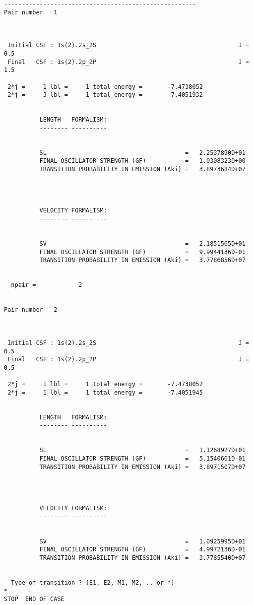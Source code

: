 \documentclass[fleqn,10pt]{book}
\begin{document}
\begin{verbatim}
------------------------------------------------------
Pair number   1



 Initial CSF : 1s(2).2s_2S                                        J = 0.5
 Final   CSF : 1s(2).2p_2P                                        J = 1.5

 2*j =     1 lbl =     1 total energy =       -7.4738052
 2*j =     3 lbl =     1 total energy =       -7.4051932


          LENGTH   FORMALISM: 
          -------- ----------


          SL                                       =   2.2537890D+01
          FINAL OSCILLATOR STRENGTH (GF)           =   1.0308323D+00
          TRANSITION PROBABILITY IN EMISSION (Aki) =   3.8973684D+07




          VELOCITY FORMALISM: 
          -------- ----------


          SV                                       =   2.1851565D+01
          FINAL OSCILLATOR STRENGTH (GF)           =   9.9944136D-01
          TRANSITION PROBABILITY IN EMISSION (Aki) =   3.7786856D+07


  npair =            2

------------------------------------------------------
Pair number   2



 Initial CSF : 1s(2).2s_2S                                        J = 0.5
 Final   CSF : 1s(2).2p_2P                                        J = 0.5

 2*j =     1 lbl =     1 total energy =       -7.4738052
 2*j =     1 lbl =     1 total energy =       -7.4051945


          LENGTH   FORMALISM: 
          -------- ----------


          SL                                       =   1.1268927D+01
          FINAL OSCILLATOR STRENGTH (GF)           =   5.1540601D-01
          TRANSITION PROBABILITY IN EMISSION (Aki) =   3.8971507D+07




          VELOCITY FORMALISM: 
          -------- ----------


          SV                                       =   1.0925995D+01
          FINAL OSCILLATOR STRENGTH (GF)           =   4.9972136D-01
          TRANSITION PROBABILITY IN EMISSION (Aki) =   3.7785540D+07


  Type of transition ? (E1, E2, M1, M2, .. or *) 
*
STOP  END OF CASE
 

\end{verbatim}     
\end{document}
